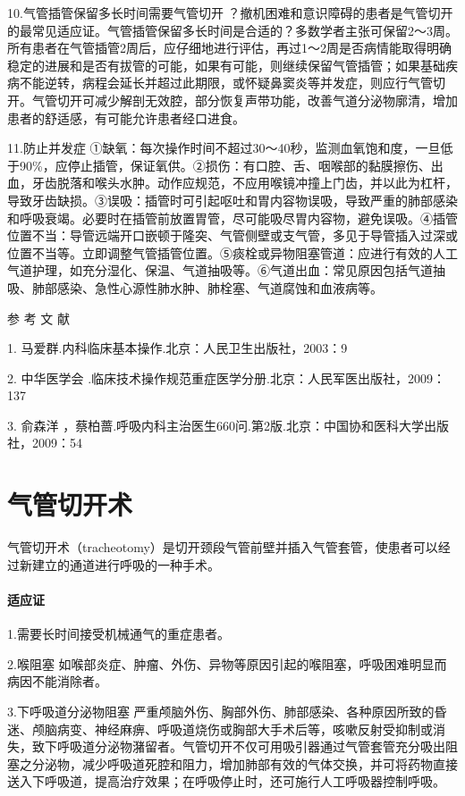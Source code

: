 10.气管插管保留多长时间需要气管切开
？撤机困难和意识障碍的患者是气管切开的最常见适应证。气管插管保留多长时间是合适的？多数学者主张可保留2～3周。所有患者在气管插管2周后，应仔细地进行评估，再过1～2周是否病情能取得明确稳定的进展和是否有拔管的可能，如果有可能，则继续保留气管插管；如果基础疾病不能逆转，病程会延长并超过此期限，或怀疑鼻窦炎等并发症，则应行气管切开。气管切开可减少解剖无效腔，部分恢复声带功能，改善气道分泌物廓清，增加患者的舒适感，有可能允许患者经口进食。

11.防止并发症
①缺氧：每次操作时间不超过30～40秒，监测血氧饱和度，一旦低于90\%，应停止插管，保证氧供。②损伤：有口腔、舌、咽喉部的黏膜擦伤、出血，牙齿脱落和喉头水肿。动作应规范，不应用喉镜冲撞上门齿，并以此为杠杆，导致牙齿缺损。③误吸：插管时可引起呕吐和胃内容物误吸，导致严重的肺部感染和呼吸衰竭。必要时在插管前放置胃管，尽可能吸尽胃内容物，避免误吸。④插管位置不当：导管远端开口嵌顿于隆突、气管侧壁或支气管，多见于导管插入过深或位置不当等。立即调整气管插管位置。⑤痰栓或异物阻塞管道：应进行有效的人工气道护理，如充分湿化、保温、气道抽吸等。⑥气道出血：常见原因包括气道抽吸、肺部感染、急性心源性肺水肿、肺栓塞、气道腐蚀和血液病等。

\protect\hypertarget{text00364.html}{}{}

\hypertarget{text00364.htmlux5cux23CHP16-1-5}{}
参 考 文 献

1. 马爱群.内科临床基本操作.北京：人民卫生出版社，2003：9

2. 中华医学会
.临床技术操作规范重症医学分册.北京：人民军医出版社，2009：137

3. 俞森洋
，蔡柏蔷.呼吸内科主治医生660问.第2版.北京：中国协和医科大学出版社，2009：54

\protect\hypertarget{text00365.html}{}{}

\chapter{气管切开术}

气管切开术（tracheotomy）是切开颈段气管前壁并插入气管套管，使患者可以经过新建立的通道进行呼吸的一种手术。

\subsubsection{适应证}

1.需要长时间接受机械通气的重症患者。

2.喉阻塞
如喉部炎症、肿瘤、外伤、异物等原因引起的喉阻塞，呼吸困难明显而病因不能消除者。

3.下呼吸道分泌物阻塞
严重颅脑外伤、胸部外伤、肺部感染、各种原因所致的昏迷、颅脑病变、神经麻痹、呼吸道烧伤或胸部大手术后等，咳嗽反射受抑制或消失，致下呼吸道分泌物潴留者。气管切开不仅可用吸引器通过气管套管充分吸出阻塞之分泌物，减少呼吸道死腔和阻力，增加肺部有效的气体交换，并可将药物直接送入下呼吸道，提高治疗效果；在呼吸停止时，还可施行人工呼吸器控制呼吸。

